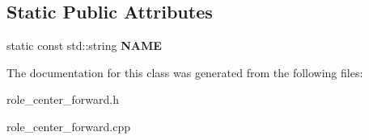 \subsection*{Static Public Attributes}
\begin{DoxyCompactItemize}
\item 
\hypertarget{classRoleCenterForward_a1465aadf1bcbca21dee29d79ecadd554}{
static const std::string {\bfseries NAME}}
\label{classRoleCenterForward_a1465aadf1bcbca21dee29d79ecadd554}

\end{DoxyCompactItemize}


The documentation for this class was generated from the following files:\begin{DoxyCompactItemize}
\item 
role\_\-center\_\-forward.h\item 
role\_\-center\_\-forward.cpp\end{DoxyCompactItemize}
